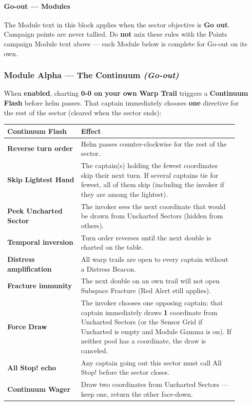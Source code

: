 \documentclass[11pt]{article}
\begin{document}
\paragraph{Go-out --- Modules}\label{go-out--modules}

The Module text in this block applies when the sector objective is
\textbf{Go out}. Campaign points are never tallied. Do \textbf{not}
mix these rules with the Points campaign Module text above --- each
Module below is complete for Go-out on its own.

\subsubsection{Module Alpha --- The Continuum
\emph{(Go-out)}}\label{module-alpha--the-continuum-go-out}

When \textbf{enabled}, charting \textbf{0-0 on your own Warp Trail}
triggers a \textbf{Continuum Flash} before helm passes. That captain
immediately chooses \textbf{one} directive for the rest of the sector
(cleared when the sector ends):

\begin{longtable}[]{@{}>{\raggedright\arraybackslash}p{0.30\linewidth}>{\raggedright\arraybackslash}p{0.64\linewidth}@{}}
\toprule\noalign{}
Continuum Flash & Effect \\
\midrule\noalign{}
\endhead
\bottomrule\noalign{}
\endlastfoot
\textbf{Reverse turn order} & Helm passes counter-clockwise for the rest
of the sector. \\
\textbf{Skip Lightest Hand} & The captain(s) holding the fewest
coordinates skip their next turn. If several captains tie for fewest,
all of them skip (including the invoker if they are among the
lightest). \\
\textbf{Peek Uncharted Sector} & The invoker sees the next coordinate that
would be drawn from Uncharted Sectors (hidden from others). \\
\textbf{Temporal inversion} & Turn order reverses until the next double
is charted on the table. \\
\textbf{Distress amplification} & All warp trails are open to every
captain without a Distress Beacon. \\
\textbf{Fracture immunity} & The next double on an own trail will not
open Subspace Fracture (Red Alert still applies). \\
\textbf{Force Draw} & The invoker chooses one opposing captain; that
captain immediately draws \textbf{1} coordinate from Uncharted Sectors
(or the Sensor Grid if Uncharted is empty and Module Gamma is on). If
neither pool has a coordinate, the draw is canceled. \\
\textbf{All Stop! echo} & Any captain going out this sector must call All
Stop! before the sector closes. \\
\textbf{Continuum Wager} & Draw two coordinates from Uncharted
Sectors --- keep one, return the other face-down. \\
\end{longtable}
\end{document}
